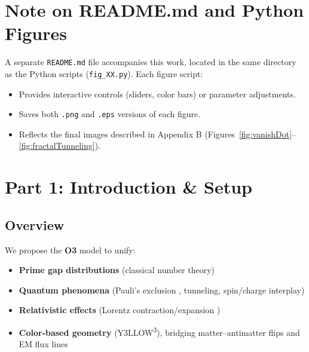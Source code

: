 \documentclass[11pt]{article}
\begin{document}
\tableofcontents
\clearpage

\listoffigures
\clearpage

\section*{Note on README.md and Python Figures}
A separate \texttt{README.md} file accompanies this work, located in the same directory as the Python scripts (\texttt{fig\_XX.py}). Each figure script:

\begin{itemize}
    \item Provides interactive controls (sliders, color bars) or parameter adjustments.
    \item Saves both \texttt{.png} and \texttt{.eps} versions of each figure.
    \item Reflects the final images described in Appendix B (Figures~\ref{fig:vanishDot}--\ref{fig:fractalTunneling}).
\end{itemize}

\clearpage

\section{Part 1: Introduction \& Setup}
\label{part1}

\subsection{Overview}
We propose the \textbf{O3} model to unify:

\begin{itemize}
    \item \textbf{Prime gap distributions} (classical number theory)
    \item \textbf{Quantum phenomena} (Pauli’s exclusion \cite{Pauli1925}, tunneling, spin/charge interplay)
    \item \textbf{Relativistic effects} (Lorentz contraction/expansion \cite{Lorentz1904})
    \item \textbf{Color-based geometry} (Y3LLOW\textsuperscript{3}), bridging matter--antimatter flips and EM flux lines
\end{itemize}
\end{document}
